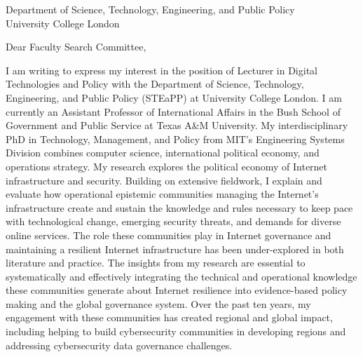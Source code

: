 \documentclass[11pt]{letter}
\begin{document}
\begin{letter}
{
  \vspace{-3.5\baselineskip}

  Department of Science, Technology, Engineering, and Public Policy \\ 
  University College London
}

\opening{Dear Faculty Search Committee,}

I am writing to express my interest in the position of Lecturer in Digital Technologies and Policy with the Department of Science, Technology, Engineering, and Public Policy (STEaPP) at University College London.  
%
I am currently an Assistant Professor of International Affairs in the Bush School of Government and Public Service at Texas A\&M University.  
%
My interdisciplinary PhD in Technology, Management, and Policy from MIT's Engineering Systems Division combines computer science, international political economy, and operations strategy.
%
My research explores the political economy of Internet infrastructure and security.
%
Building on extensive fieldwork, I explain and evaluate how operational epistemic communities managing the Internet's infrastructure create and sustain the knowledge and rules necessary to keep pace with technological change, emerging security threats, and demands for diverse online services.
%
The role these communities play in Internet governance and maintaining a resilient Internet infrastructure has been under-explored in both literature and practice.
%
%
%
The insights from my research are essential to systematically and effectively integrating the technical and operational knowledge these communities generate about Internet resilience into evidence-based policy making and the global governance system.
%
Over the past ten years, my engagement with these communities has created  regional and global impact, including helping to build cybersecurity communities in developing regions and addressing cybersecurity data governance challenges.
%



\end{letter}
\end{document}
